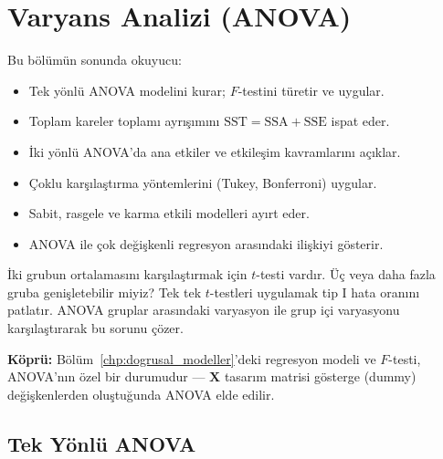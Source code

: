 \chapter{Varyans Analizi (ANOVA)}
\label{chp:anova}


\begin{kazanimlar}
Bu bölümün sonunda okuyucu:
\begin{itemize}
  \item Tek yönlü ANOVA modelini kurar; $F$-testini türetir ve uygular.
  \item Toplam kareler toplamı ayrışımını $\mathrm{SST} = \mathrm{SSA} + \mathrm{SSE}$ ispat eder.
  \item İki yönlü ANOVA'da ana etkiler ve etkileşim kavramlarını açıklar.
  \item Çoklu karşılaştırma yöntemlerini (Tukey, Bonferroni) uygular.
  \item Sabit, rasgele ve karma etkili modelleri ayırt eder.
  \item ANOVA ile çok değişkenli regresyon arasındaki ilişkiyi gösterir.
\end{itemize}
\end{kazanimlar}

\begin{motivasyon}
İki grubun ortalamasını karşılaştırmak için $t$-testi vardır. Üç veya daha fazla gruba genişletebilir miyiz? Tek tek $t$-testleri uygulamak tip I hata oranını patlatır. ANOVA gruplar arasındaki varyasyon ile grup içi varyasyonu karşılaştırarak bu sorunu çözer.

\medskip
\noindent\textbf{Köprü:} Bölüm~\ref{chp:dogrusal_modeller}'deki regresyon modeli ve $F$-testi, ANOVA'nın özel bir durumudur --- $\mathbf{X}$ tasarım matrisi gösterge (dummy) değişkenlerden oluştuğunda ANOVA elde edilir.
\end{motivasyon}

\section{Tek Yönlü ANOVA}
\label{sec:tek_anova}

